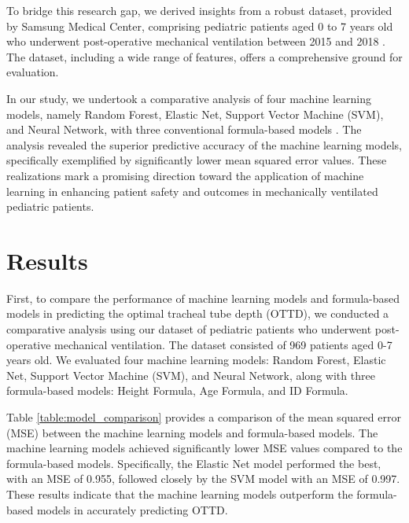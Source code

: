 \documentclass[11pt]{article}
\begin{document}
To bridge this research gap, we derived insights from a robust dataset, provided by Samsung Medical Center, comprising pediatric patients aged 0 to 7 years old who underwent post-operative mechanical ventilation between 2015 and 2018 \cite{Harbaugh2018PersistentOU, Flori2011PositiveFB, Weiss2006TrachealTD}. The dataset, including a wide range of features, offers a comprehensive ground for evaluation.

In our study, we undertook a comparative analysis of four machine learning models, namely Random Forest, Elastic Net, Support Vector Machine (SVM), and Neural Network, with three conventional formula-based models \cite{Kitabatake2005ECHOCARDIOGRAPHVDOPPLERNE, Ziemian2010GuideTS}. The analysis revealed the superior predictive accuracy of the machine learning models, specifically exemplified by significantly lower mean squared error values. These realizations mark a promising direction toward the application of machine learning in enhancing patient safety and outcomes in mechanically ventilated pediatric patients.

\section*{Results}

First, to compare the performance of machine learning models and formula-based models in predicting the optimal tracheal tube depth (OTTD), we conducted a comparative analysis using our dataset of pediatric patients who underwent post-operative mechanical ventilation. The dataset consisted of 969 patients aged 0-7 years old. We evaluated four machine learning models: Random Forest, Elastic Net, Support Vector Machine (SVM), and Neural Network, along with three formula-based models: Height Formula, Age Formula, and ID Formula.

Table \ref{table:model_comparison} provides a comparison of the mean squared error (MSE) between the machine learning models and formula-based models. The machine learning models achieved significantly lower MSE values compared to the formula-based models. Specifically, the Elastic Net model performed the best, with an MSE of 0.955, followed closely by the SVM model with an MSE of 0.997. These results indicate that the machine learning models outperform the formula-based models in accurately predicting OTTD.
\end{document}
